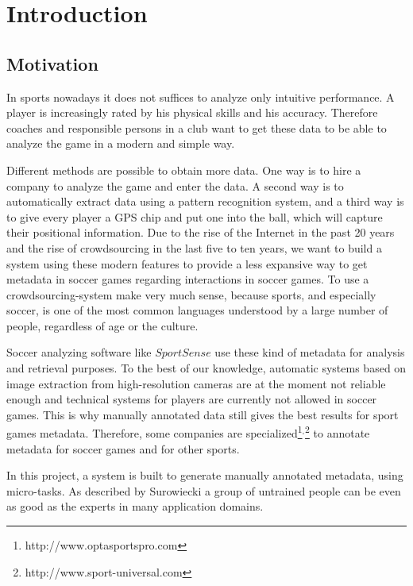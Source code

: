 \chapter{Introduction}

\section{Motivation}

In sports nowadays it does not suffices to analyze only intuitive performance. A player is increasingly rated by his physical skills and his accuracy. Therefore coaches and responsible persons in a club want to get these data to be able to analyze the game in a modern and simple way.

Different methods are possible to obtain more data. One way is to hire a company to analyze the game and enter the data. A second way is to automatically extract data using a pattern recognition system, and a third way is to give every player a GPS chip and put one into the ball, which will capture their positional information.
\newline
Due to the rise of the Internet in the past 20 years and the rise of crowdsourcing in the last five to ten years, we want to build a system using these modern features to provide a less expansive way to get metadata in soccer games regarding interactions in soccer games.
To use a crowdsourcing-system make very much sense, because sports, and especially soccer, is one of the most common languages understood by a large number of people, regardless of age or the culture.

Soccer analyzing software like $SportSense$ \cite{AlKabary:2013} use these kind of metadata for analysis and retrieval purposes. To the best of our knowledge, automatic systems based on image extraction from high-resolution cameras \cite{Ballan:2007, Seo:1997, Iwase:2004} are at the moment not reliable enough and technical systems for players are currently not allowed in soccer games. This is why manually annotated data still gives the best results for sport games metadata.
\newline
Therefore, some companies are specialized{\footnote{http://www.optasportspro.com}$^,$\footnote{http://www.sport-universal.com}} to annotate metadata for soccer games and for other sports.

In this project, a system is built to generate manually annotated metadata, using micro-tasks. As described by Surowiecki \cite{Suwowiecki:2005} a group of untrained people can be even as good as the experts in many application domains.

